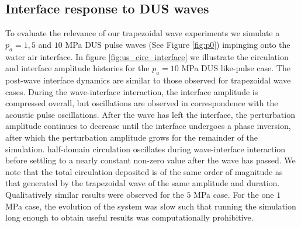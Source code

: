 \subsection{Interface response to \acf{DUS} waves}%
\label{subsec:usbe_lung_trapezoidal_results}%
To evaluate the relevance of our trapezoidal wave experiments we simulate
a $p_a=1, 5$ and $10$ MPa \ac{DUS} pulse waves (See Figure
\ref{fig:p0}) impinging onto the water air interface. In figure
\ref{fig:us_circ_interface} we illustrate the circulation and
interface amplitude histories for the $p_a=10$ MPa \ac{DUS} like-pulse
case. The post-wave interface dynamics are similar to those observed
for trapezoidal wave cases. During the wave-interface interaction, the
interface amplitude is compressed overall, but oscillations are
observed in correspondence with the acoustic pulse oscillations. After
the wave has left the interface, the perturbation amplitude continues
to decrease until the interface undergoes a phase inversion, after
which the perturbation amplitude grows for the remainder of the
simulation. half-domain circulation oscillates during wave-interface
interaction before settling to a nearly constant non-zero value after
the wave has passed. We note that the total circulation deposited is
of the same order of magnitude as that generated by the trapezoidal
wave of the same amplitude and duration. Qualitatively similar results
were observed for the $5$ MPa case. For the one $1$ MPa case, the
evolution of the system was slow such that running the simulation long
enough to obtain useful results was computationally prohibitive.

